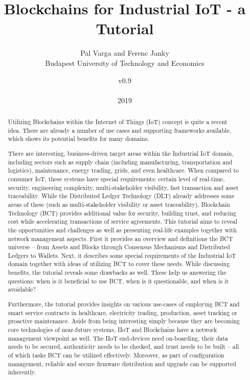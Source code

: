 \documentclass[a4paper]{article}
\title{Blockchains for Industrial IoT - a Tutorial}
\author{Pal Varga and Ferenc Janky \\ Budapest University of Technology and Economics}
\date{v0.9 \\ \\ 2019}
\begin{document}
\maketitle

\begin{abstract}
Utilizing Blockchains within the Internet of Things (IoT) concept is quite a recent idea. There are already a number of use cases and supporting frameworks available, which shows its potential benefits for many domains.

There are interesting, business-driven target areas within the Industrial IoT domain, including sectors such as supply chain (including manufacturing, transportation and logistics), maintenance, energy trading, grids, and even healthcare. When compared to consumer IoT, these systems have special requirements: certain level of real-time, security, engineering complexity, multi-stakeholder visibility, fast transaction and asset traceability. While the Distributed Ledger Technology (DLT) already addresses some areas of these (such as multi-stakeholder visibility or asset traceability), Blockchain Technology (BCT) provides additional value for security, building trust, and reducing cost while accelerating transactions of service agreements.
This tutorial aims to reveal the opportunities and challenges as well as presenting real-life examples together with network management aspects. First it provides an overview and definitions the BCT universe – from Assets and Blocks through Consensus Mechanisms and Distributed Ledgers to Wallets. Next, it describes some special requirements of the Industrial IoT domain together with ideas of utilizing BCT to cover these needs. While discussing benefits, the tutorial reveals some drawbacks as well. These help us answering the questions: when is it beneficial to use BCT, when is it questionable, and when is it avoidable?

Furthermore, the tutorial provides insights on various use-cases of employing BCT and smart service contracts in healthcare, electricity trading, production, asset tracking or proactive maintenance. Aside from being interesting simply because they are becoming core technologies of near-future systems, IIoT and Blockchains have a network management viewpoint as well. The IIoT end-devices need on-boarding, their data needs to be secured, authenticity needs to be checked, and trust needs to be built – all of which tasks BCT can be utilized effectively. Moreover, as part of configuration management, reliable and secure firmware distribution and upgrade can be supported inherently.


\end{abstract}
\end{document}
